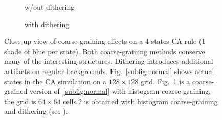 \begin{figure}[th]
\begin{subfigure}{.32\linewidth}
    \caption{\label{subfig:no-dithering}w/out dithering}
  \end{subfigure}
  \hfill
  \begin{subfigure}{.32\linewidth}
    \caption{\label{subfig:dithering}with dithering}
  \end{subfigure}

  \caption{\label{fig:close-up} Close-up view of coarse-graining effects on a
    4-states CA rule (1 shade of blue per state). Both coarse-graining methods
    conserve many of the interesting structures. Dithering introduces additional
    artifacts on regular backgrounds. Fig.~\ref{subfig:normal} shows actual
    states in the CA simulation on a $128 \times 128$ grid.
    Fig.~\ref{subfig:no-dithering} is a coarse-grained version
    of~\ref{subfig:normal} with histogram coarse-graining, the grid is
    $64 \times 64$ cells.\ref{subfig:dithering} is obtained with histogram
    coarse-graining and dithering (see ).}
\end{figure}


